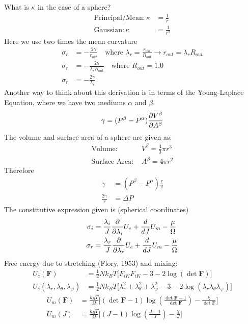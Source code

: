 \documentclass[12pt,3p]{article}
\numberwithin{equation}{section}
\begin{document}
What is $\kappa$ in the case of a sphere? 
\begin{align*}
\text{Principal/Mean}: \kappa &= \frac{1}{r} \\
\text{Gaussian}: \kappa &= \frac{1}{r^2} 
\end{align*}
Here we use two times the mean curvature
\begin{align*}
\sigma_r &= -\frac{2 \gamma}{r_{out}} \quad \text{where } \lambda_r = \frac{r_{out}}{R_{out}} \rightarrow r_{out} = \lambda_r R_{out} \\
\sigma_r &= - \frac{2 \gamma}{\lambda_r R_{out}} \quad \text{where } R_{out} = 1.0 \\
\sigma_r &= - \frac{2 \gamma}{\lambda_r} 
\end{align*}
Another way to think about this derivation is in terms of the Young-Laplace Equation, where we have two mediums $\alpha$ and $\beta$. 
\begin{align*}
\gamma = (P^\beta - P^{\alpha}) \pdv{V^{\beta}}{A^\beta}
\end{align*}
The volume and surface area of a sphere are given as:
\begin{align*}
\text{Volume: } & V^\beta = \frac{4}{3} \pi r^3 \\
\text{Surface Area: } & A ^\beta= 4 \pi r^2
\end{align*}
Therefore
\begin{align*}
\gamma &= (P^\beta - P^{\alpha}) \frac{r}{2} \\
\frac{2 \gamma}{r} &= \Delta P 
\end{align*}
The constitutive expression given is (spherical coordinates)
\begin{align*}
\sigma_i  &= \frac{\lambda_i}{J} \pdv{}{\lambda_i} U_e + \frac{d}{dJ} U_m - \frac{\mu}{\Omega} \\
\sigma_r &= \frac{\lambda_r}{J} \pdv{}{\lambda_r} U_e + \frac{d}{dJ} U_m - \frac{\mu}{\Omega}
\end{align*} 
Free energy due to stretching (Flory, 1953) and mixing: 
\begin{align*}
U_e (\boldsymbol{F}) &= \frac{1}{2} N k_B T \big[ F_{iK} F_{iK} - 3 - 2 \log (\det \mathbf{F}) \big]  \\
U_e (\lambda_r, \lambda_\theta, \lambda_\varphi) &= \frac{1}{2} N k_B T \big[ \lambda_r^2 + \lambda_\theta^2 + \lambda_\varphi^2 - 3 - 2 \log (\lambda_r \lambda_\theta \lambda_\varphi) \big] 
\end{align*}
\begin{align*}
U_m(\mathbf{F}) &= \frac{k_B T}{\Omega} \bigg[ (\det \mathbf{F} - 1) \log (\frac{\det \mathbf{F} - 1}{\det \mathbf{F}}) - \frac{\chi}{\det \mathbf{F}} \bigg] \\
U_m(J)  &= \frac{k_B T}{\Omega} \bigg[ (J- 1) \log (\frac{J - 1}{J}) - \frac{\chi}{J} \bigg] 
\end{align*}
\end{document}
